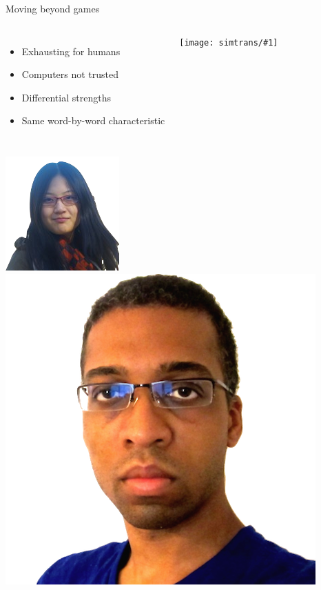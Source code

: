 \documentclass[compress]{beamer}
\newcommand{\gfxs}[2]{
\begin{center}
	\texttt{[image: simtrans/\#1]}
\end{center}
}
\begin{document}
\begin{frame}{Moving beyond games}

  \begin{columns}
  \begin{itemize}
    \item Exhausting for humans
    \item Computers not trusted
    \item Differential strengths
    \item Same word-by-word characteristic
  \end{itemize}

 \gfxs{computer-interpreter}{1.0}
 \end{columns}
\end{frame}


\begin{frame}{}
  \begin{columns}
    \begin{center}
        \includegraphics[width=0.8\linewidth]{general_figures/hehe} \\
        \includegraphics[width=0.8\linewidth]{general_figures/alvin}

\end{center}
\end{columns}
\end{frame}
\end{document}
